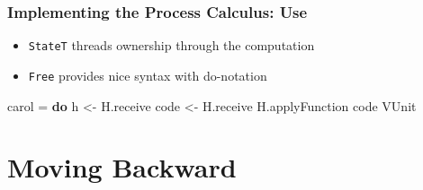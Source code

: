 \documentclass[12pt]{beamer}
\newenvironment{Shaded}{}{}
\newcommand{\KeywordTok}[1]{\textcolor[rgb]{0.00,0.44,0.13}{\textbf{#1}}}
\newcommand{\DataTypeTok}[1]{\textcolor[rgb]{0.56,0.13,0.00}{#1}}
\newcommand{\StringTok}[1]{\textcolor[rgb]{0.25,0.44,0.63}{#1}}
\newcommand{\OtherTok}[1]{\textcolor[rgb]{0.00,0.44,0.13}{#1}}
\newcommand{\FunctionTok}[1]{\textcolor[rgb]{0.02,0.16,0.49}{#1}}
\newcommand{\NormalTok}[1]{#1}
\begin{document}
\begin{frame}[fragile]
\frametitle{Implementing the Process Calculus: Use}

\begin{itemize}
    \item \texttt{StateT} threads ownership through the computation
    \item \texttt{Free} provides nice syntax with do-notation 
\end{itemize}

\begin{Shaded}
\end{Shaded}

\begin{Shaded}
\begin{Highlighting}[]
\NormalTok{carol }\FunctionTok{=} \KeywordTok{do} 
\NormalTok{    h }\OtherTok{<-}\NormalTok{ H.receive }
\NormalTok{    code }\OtherTok{<-}\NormalTok{ H.receive }
\NormalTok{    H.applyFunction code }\DataTypeTok{VUnit}
\end{Highlighting}
\end{Shaded}

\end{frame}

\section{Moving Backward}
\end{document}
